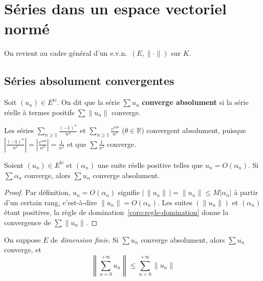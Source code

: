 \section{Séries dans un espace vectoriel normé}
\label{sec:series-evn}

On revient au cadre général d'un e.v.n.\ $(E,\|\cdot\|)$ sur $K$.

\subsection{Séries absolument convergentes}

\begin{defi}
\label{defi:cv-absolue}
Soit $(u_n)\in E^{\mathbb{N}}$. On dit que la série $\sum u_n$ \textbf{converge absolument} si la série réelle à termes positifs $\sum\|u_n\|$ converge.
\end{defi}

\begin{exemple}
Les séries $\sum_{n\geq1}\frac{(-1)^n}{n^2}$ et $\sum_{n\geq1}\frac{e^{in\theta}}{n^2}$ ($\theta\in\mathbb{R}$) convergent absolument, puisque $\left|\frac{(-1)^n}{n^2}\right|=\left|\frac{e^{in\theta}}{n^2}\right|=\frac{1}{n^2}$ et que $\sum\frac{1}{n^2}$ converge.
\end{exemple}

\begin{prop}
\label{prop:domination-cv-absolue}
Soient $(u_n)\in E^{\mathbb{N}}$ et $(\alpha_n)$ une suite réelle positive telles que $u_n=O(\alpha_n)$. Si $\sum\alpha_n$ converge, alors $\sum u_n$ converge absolument.
\end{prop}

\begin{proof}
Par définition, $u_n=O(\alpha_n)$ signifie $\big|\,\|u_n\|\,\big|=\|u_n\|\leq M|\alpha_n|$ à partir d'un certain rang, c'est-à-dire $\|u_n\|=O(\alpha_n)$. Les suites $(\|u_n\|)$ et $(\alpha_n)$ étant positives, la règle de domination~\ref{coro:regle-domination} donne la convergence de $\sum\|u_n\|$.
\end{proof}

\begin{theo}
\label{theo:cv-absolue}
On suppose $E$ de \emph{dimension finie}. Si $\sum u_n$ converge absolument, alors $\sum u_n$ converge, et
\[\left\|\sum_{n=0}^{+\infty}u_n\right\|\leq\sum_{n=0}^{+\infty}\|u_n\|\]
\end{theo}

